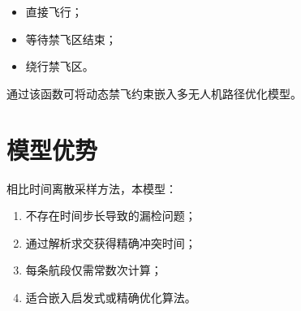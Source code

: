 \documentclass[UTF8]{ctexart}
\begin{document}
\begin{itemize}
    \item 直接飞行；
    \item 等待禁飞区结束；
    \item 绕行禁飞区。
\end{itemize}

通过该函数可将动态禁飞约束嵌入多无人机路径优化模型。

\section{模型优势}

相比时间离散采样方法，本模型：

\begin{enumerate}
    \item 不存在时间步长导致的漏检问题；
    \item 通过解析求交获得精确冲突时间；
    \item 每条航段仅需常数次计算；
    \item 适合嵌入启发式或精确优化算法。
\end{enumerate}
\end{document}
